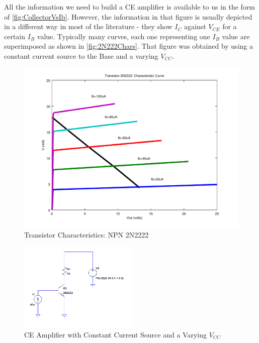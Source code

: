 All the information we need to build a CE amplifier is available to us in the form of \autoref{fig:CollectorVsIb}. However, the information in that figure is usually depicted in a different way in most of the literature - they show $I_C$ against $V_{CE}$ for a certain $I_B$ value. Typically many curves, each one representing one $I_B$ value are superimposed as shown in \autoref{fig:2N222Chars}. That figure was obtained by using a constant current source to the Base and a varying $V_{CC}$.

	\begin{figure}[h!]
	\centering
	\includegraphics[width = \textwidth]{partHW/TransCharacts2N2222}
	\caption{Transistor Characteristics: NPN 2N2222}
	\label{fig:2N222Chars}
	\end{figure}

	\begin{figure}[h!]
	\centering
	\includegraphics[width = 0.5\textwidth]{partHW/ConstantCurrentSourceBase}
	\caption{CE Amplifier with Constant Current Source and a Varying $V_{CC}$}
	\label{fig:ConstIb_VaryingVcc}
	\end{figure}

